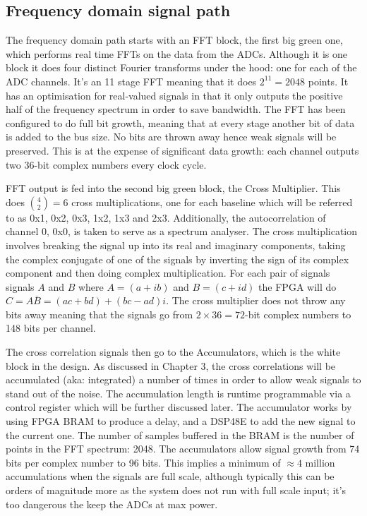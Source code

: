 \subsection{Frequency domain signal path}
The frequency domain path starts with an FFT block, the first big green one,  which performs real time FFTs on the data from the ADCs. Although it is one block it does four distinct Fourier transforms under the hood: one for each of the ADC channels. It's an 11 stage FFT meaning that it does \(2^{11} = 2048\) points. It has an optimisation for real-valued signals in that it only outputs the positive half of the frequency spectrum in order to save bandwidth. The FFT has been configured to do full bit growth, meaning that at every stage another bit of data is added to the bus size. No bits are thrown away hence weak signals will be preserved. This is at the expense of significant data growth: each channel outputs two 36-bit complex numbers every clock cycle.

FFT output is fed into the second big green block, the Cross Multiplier. This does \({4 \choose 2} = 6\) cross multiplications, one for each baseline which will be referred to as 0x1, 0x2, 0x3, 1x2, 1x3 and 2x3. Additionally, the autocorrelation of channel 0, 0x0, is taken to serve as a spectrum analyser. The cross multiplication involves breaking the signal up into its real and imaginary components, taking the complex conjugate of one of the signals by inverting the sign of its complex component and then doing complex multiplication. For each pair of signals signals \(A\) and \(B\) where \(A = (a + ib)\) and \(B = (c + id)\) the FPGA will do \(C = A\overline{B} = (ac + bd) + (bc - ad)i\). The cross multiplier does not throw any bits away meaning that the signals go from \(2 \times 36 = 72\)-bit complex numbers to 148 bits per channel.

The cross correlation signals then go to the Accumulators, which is the white block in the design. As discussed in Chapter 3, the cross correlations will be accumulated (aka: integrated) a number of times in order to allow weak signals to stand out of the noise. The accumulation length is runtime programmable via a control register which will be further discussed later. The accumulator works by using FPGA BRAM to produce a delay, and a DSP48E to add the new signal to the current one. The number of samples buffered in the BRAM is the number of points in the FFT spectrum: 2048. The accumulators allow signal growth from 74 bits per complex number to 96 bits. This implies a minimum of \(\approx 4\) million accumulations when the signals are full scale, although typically this can be orders of magnitude more as the system does not run with full scale input; it's too dangerous the keep the ADCs at max power.

